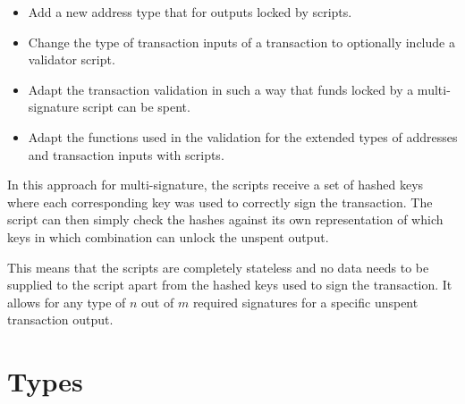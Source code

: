 \documentclass[11pt,a4paper,dvipsnames]{article}
\theoremstyle{definition}
\begin{document}
\begin{itemize}
\item Add a new address type that for outputs locked by scripts.
\item Change the type of transaction inputs of a transaction to optionally
  include a validator script.
\item Adapt the transaction validation in such a way that funds locked by a
  multi-signature script can be spent.
\item Adapt the functions used in the validation for the extended types of
  addresses and transaction inputs with scripts.
\end{itemize}

In this approach for multi-signature, the scripts receive a set of hashed keys
where each corresponding key was used to correctly sign the transaction. The
script can then simply check the hashes against its own representation of which
keys in which combination can unlock the unspent output.

This means that the scripts are completely stateless and no data needs to be
supplied to the script apart from the hashed keys used to sign the transaction.
It allows for any type of $n$ out of $m$ required signatures for a specific
unspent transaction output.

\section{Types}
\label{sec:types}
\end{document}
